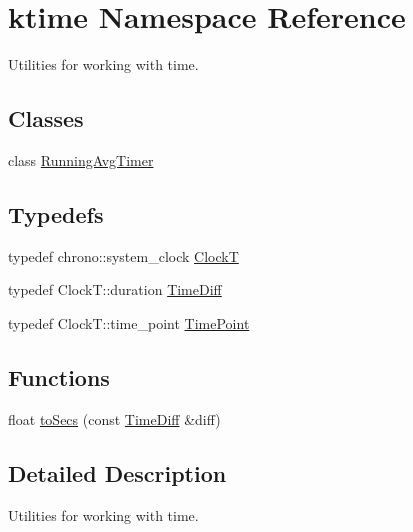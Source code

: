 \hypertarget{namespacektime}{\section{ktime Namespace Reference}
\label{namespacektime}
}


Utilities for working with time.  


\subsection*{Classes}
\begin{DoxyCompactItemize}
\item 
class \hyperlink{classktime_1_1_running_avg_timer}{Running\-Avg\-Timer}
\end{DoxyCompactItemize}
\subsection*{Typedefs}
\begin{DoxyCompactItemize}
\item 
typedef chrono\-::system\-\_\-clock \hyperlink{namespacektime_ac6b33ea027bdc032e7ba377509c8e51f}{Clock\-T}
\item 
typedef Clock\-T\-::duration \hyperlink{namespacektime_aacefffdcc0ccc2f45598475b3557d6f2}{Time\-Diff}
\item 
typedef Clock\-T\-::time\-\_\-point \hyperlink{namespacektime_a038a3d1fb2cb9885396233d6e412773e}{Time\-Point}
\end{DoxyCompactItemize}
\subsection*{Functions}
\begin{DoxyCompactItemize}
\item 
float \hyperlink{namespacektime_a89b89374ae2f385f58b64c5a2438a718}{to\-Secs} (const \hyperlink{namespacektime_aacefffdcc0ccc2f45598475b3557d6f2}{Time\-Diff} \&diff)
\end{DoxyCompactItemize}


\subsection{Detailed Description}
Utilities for working with time. 

